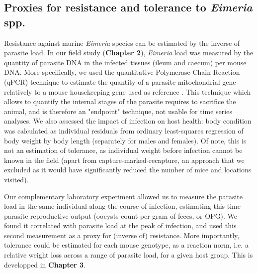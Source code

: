 \subsection{Proxies for resistance and tolerance to \textit{Eimeria} spp.}
Resistance against murine \textit{Eimeria} species can be estimated by the inverse of parasite load. In our field study (\textbf{Chapter 2}), \textit{Eimeria} load was measured by the quantity of parasite DNA in the infected tissues (ileum and caecum) per mouse DNA. More specifically, we used the quantitative Polymerase Chain Reaction (qPCR) technique to estimate the quantity of a parasite mitochondrial gene relatively to a mouse housekeeping gene used as reference \citep{al-khlifeh_eimeria_2019, jarquin-diaz_detection_2019}. This technique which allows to quantify the internal stages of the parasite requires to sacrifice the animal, and is therefore an "endpoint" technique, not usable for time series analyses. We also assessed the impact of infection on host health: body condition was calculated as individual residuals from ordinary least-squares regression of body weight by body length (separately for males and females). Of note, this is not an estimation of tolerance, as individual weight before infection cannot be known in the field (apart from capture-marked-recapture, an approach that we excluded as it would have significantly reduced the number of mice and locations visited).
\par
Our complementary laboratory experiment allowed us to measure the parasite load in the same individual along the course of infection, estimating this time parasite reproductive output (oocysts count per gram of feces, or OPG). We found it correlated with parasite load at the peak of infection, and used this second measurement as a proxy for (inverse of) resistance. More importantly, tolerance could be estimated for each mouse genotype, as a reaction norm, i.e. a relative weight loss across a range of parasite load, for a given host group. This is developped in \textbf{Chapter 3}.

\newpage

